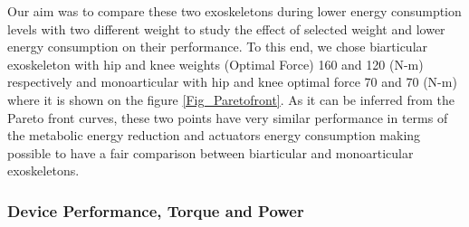 \documentclass[10pt,letterpaper]{article}
\begin{document}
Our aim was to compare these two exoskeletons during lower energy consumption levels with two different weight to study the effect of selected weight and lower energy consumption on their performance. To this end, we chose biarticular exoskeleton with hip and knee weights (Optimal Force) 160 and 120 (N-m) respectively and monoarticular with hip and knee optimal force 70 and 70 (N-m) where it is shown on the figure \ref{Fig_Paretofront}. As it can be inferred from the Pareto front curves, these two points have very similar performance in terms of the metabolic energy reduction and actuators energy consumption making possible to have a fair comparison between biarticular and monoarticular exoskeletons.\\
\subsubsection*{Device Performance, Torque and Power}
\end{document}
